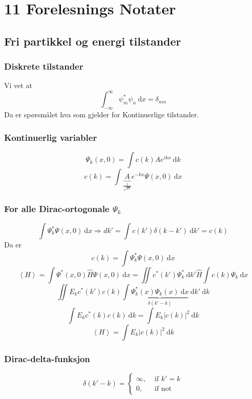 \section{11 Forelesnings Notater}
\subsection*{Fri partikkel og energi tilstander}
\subsubsection*{Diskrete tilstander}
Vi vet at 
\[
∫_{-∞}^{∞} ψ_m^{*}ψ_n \ \mathrm{d}x = δ_{mn}
\]
Da er spørsmålet hva som gjelder for Kontinuerlige tilstander.


\subsubsection*{Kontinuerlig variabler}
\[
Ψ_k(x,0) = ∫ c(k) Ae^{ikx} \ \mathrm{d}k
\]
\[
c(k) = ∫ \underbrace{A}_{\frac{1}{\sqrt{2π}}}e^{-kx}Ψ(x,0) \ \mathrm{d}x
\]
\subsubsection*{For alle Dirac-ortogonale $Ψ_k$}
\[
∫ Ψ_k^{*}Ψ(x,0) \ \mathrm{d}x ⇒ dk' = ∫ c(k')δ(k-k') \ \mathrm{d}k' = c(k)
\]
Da er
\[
c(k) = ∫  Ψ_k^{*}Ψ(x,0) \ \mathrm{d}x
\]
\[
\left<H\right> = ∫ Ψ^{*}(x,0) \hat{H}Ψ(x,0) \ \mathrm{d}x = ∬ c^{*}(k')Ψ^{*}_k \ \mathrm{d}k' \hat{H} \int c(k)Ψ_k \ \mathrm{d}x
\]
\[
∬ E_k c^{*}(k')c(k) ∫ \underbrace{Ψ_k^{*}(x)Ψ_k(x) \ \mathrm{d}x}_{δ(k' - k)} \ \mathrm{d}k' \ \mathrm{d}k
\]
\[
∫ E_k c^{*}(k)c(k) \ \mathrm{d}k = ∫ E_k \left|c(k)\right|^2 \ \mathrm{d}k
\]
\[
\left<H\right> = ∫ E_k \left|c(k)\right|^2 \ \mathrm{d}k
\]
\subsubsection*{Dirac-delta-funksjon}
\[
δ(k' - k) = 
\begin{cases}
  ∞, &\text{ if }k' = k\\
  0, &\text{ if not }
\end{cases}
\]

